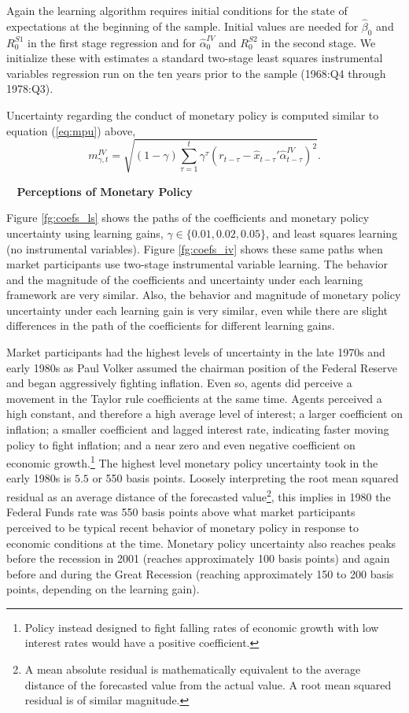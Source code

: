 \documentclass[12pt]{article}
\newcommand{\beq}{\begin{equation}}
\newcommand{\eeq}{\end{equation}}
\newcommand{\ds}{\displaystyle}
\renewcommand{\subsection}[1]{\addtocounter{subsection}{1}\begin{center}\textbf{\thesubsection~ #1}\end{center}}
\begin{document}
Again the learning algorithm requires initial conditions for the state of expectations at the beginning of the sample.  Initial values are needed for $\hat{\beta}_0$ and $R_0^{S1}$ in the first stage regression and for $\hat{\alpha}_0^{IV}$ and $R_0^{S2}$ in the second stage.  We initialize these with estimates a standard two-stage least squares instrumental variables regression run on the ten years prior to the sample (1968:Q4 through 1978:Q3).

Uncertainty regarding the conduct of monetary policy is computed similar to equation (\ref{eq:mpu}) above,
\beq \label{eq:mpuiv} m_{\gamma,t}^{IV} = \sqrt{ (1-\gamma) \ds \sum_{\tau=1}^{t} \gamma^{\tau} (r_{t-\tau} - \hat{x}_{t-\tau}'\hat{\alpha}_{t-\tau}^{IV} )^2}. \eeq  

\subsection{Perceptions of Monetary Policy}
Figure \ref{fg:coefs_ls} shows the paths of the coefficients and monetary policy uncertainty using learning gains, $\gamma \in \{0.01, 0.02, 0.05\}$, and least squares learning (no instrumental variables).  Figure \ref{fg:coefs_iv} shows these same paths when market participants use two-stage instrumental variable learning.  The behavior and the magnitude of the coefficients and uncertainty under each learning framework are very similar.  Also, the behavior and magnitude of monetary policy uncertainty under each learning gain is very similar, even while there are slight differences in the path of the coefficients for different learning gains.  

Market participants had the highest levels of uncertainty in the late 1970s and early 1980s as Paul Volker assumed the chairman position of the Federal Reserve and began aggressively fighting inflation.  Even so, agents did perceive a movement in the Taylor rule coefficients at the same time.  Agents perceived a high constant, and therefore a high average level of interest; a larger coefficient on inflation; a smaller coefficient and lagged interest rate, indicating faster moving policy to fight inflation; and a near zero and even negative coefficient on economic growth.\footnote{Policy instead designed to fight falling rates of economic growth with low interest rates would have a positive coefficient.}  The highest level monetary policy uncertainty took in the early 1980s is $5.5$ or 550 basis points.  Loosely interpreting the root mean squared residual as an average distance of the forecasted value\footnote{A mean absolute residual is mathematically equivalent to the average distance of the forecasted value from the actual value.  A root mean squared residual is of similar magnitude.}, this implies in 1980 the Federal Funds rate was 550 basis points above what market participants perceived to be typical recent behavior of monetary policy in response to economic conditions at the time.  Monetary policy uncertainty also reaches peaks before the recession in 2001 (reaches approximately 100 basis points) and again before and during the Great Recession (reaching approximately 150 to 200 basis points, depending on the learning gain).  
\end{document}
